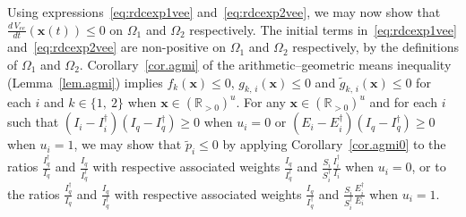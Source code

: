 \documentclass[a4paper]{article}
\begin{document}

Using expressions~\eqref{eq:rdcexp1vee} and~\eqref{eq:rdcexp2vee}, we may now show that $\frac{d\,V_{ee}}{dt}(\mathbf x(t))\leqslant 0$ on $\Omega_1$ and $\Omega_2$ respectively. The initial terms in~\eqref{eq:rdcexp1vee} and~\eqref{eq:rdcexp2vee} are non-positive on  $\Omega_1$ and $\Omega_2$ respectively, by the definitions of $\Omega_1$ and $\Omega_2$. Corollary~\ref{cor.agmi} of the arithmetic--geometric means inequality (Lemma~\ref{lem.agmi}) implies $f_k(\mathbf x)\leqslant0$, $g_{k,\,i}(\mathbf x)\leq0$ and $\widetilde g_{k,\,i}(\mathbf x)\leqslant0$ for each $i$ and  $k\in\{1,~2\}$ when  $\mathbf x\in \left(\mathbb R_{>0}\right)^u$. For any $\mathbf x\in  \left(\mathbb R_{>0}\right)^u$ and for each $i$ such that $(I_i-I^\dagger _i)(I_q-I^\dagger _q)\geqslant0$  when $u_i=0$ or $(E_i-E^\dagger _i)(I_q-I^\dagger _q)\geqslant0$  when $u_i=1$, we may show that $\widetilde p_i\leqslant 0$ by applying Corollary~\ref{cor.agmi0} to the ratios $\frac{I^\dagger _q}{I_q}$ and $\frac{I_q}{I^\dagger _q}$ with respective associated weights $\frac{I_q}{I^\dagger _q}$ and $\frac{S_i}{S^\dagger _i}\frac{I^\dagger _i}{I_i}$  when $u_i=0$, or  to the ratios $\frac{I^\dagger _q}{I_q}$ and $\frac{I_q}{I^\dagger _q}$ with respective associated weights $\frac{I_q}{I^\dagger _q}$ and $\frac{S_i}{S^\dagger _i}\frac{E^\dagger _i}{E_i}$ when $u_i=1$. 
\end{document}
